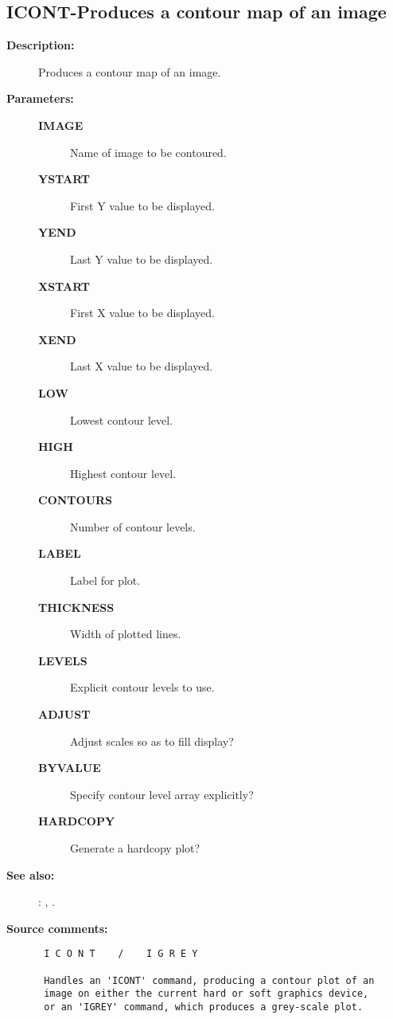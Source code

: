 \subsection{ICONT-\label{ICONT}Produces a contour map of an image}
\begin{description}

\item [{\bf Description:}]
 Produces a contour map of an image.

\item [{\bf Parameters:}]
\begin{description}
\item [{\bf IMAGE}]
 Name of image to be contoured.
\item [{\bf YSTART}]
 First Y value to be displayed.
\item [{\bf YEND}]
 Last Y value to be displayed.
\item [{\bf XSTART}]
 First X value to be displayed.
\item [{\bf XEND}]
 Last X value to be displayed.
\item [{\bf LOW}]
 Lowest contour level.
\item [{\bf HIGH}]
 Highest contour level.
\item [{\bf CONTOURS}]
 Number of contour levels.
\item [{\bf LABEL}]
 Label for plot.
\item [{\bf THICKNESS}]
 Width of plotted lines.
\item [{\bf LEVELS}]
 Explicit contour levels to use.
\item [{\bf ADJUST}]
 Adjust scales so as to fill display?
\item [{\bf BYVALUE}]
 Specify contour level array explicitly?
\item [{\bf HARDCOPY}]
 Generate a hardcopy plot?
\end{description}

\item [{\bf See also:}]
: , .\\

\item [{\bf Source comments:}]
\begin{verbatim}
 I C O N T    /    I G R E Y

 Handles an 'ICONT' command, producing a contour plot of an
 image on either the current hard or soft graphics device,
 or an 'IGREY' command, which produces a grey-scale plot.


\end{verbatim}
\end{description}
